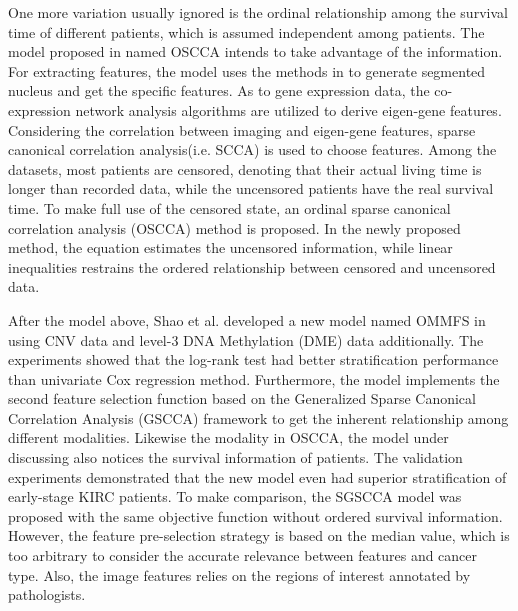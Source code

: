 \documentclass[journal,twoside,web]{ieeecolor}
\begin{document}
One more variation usually ignored is the ordinal relationship among the survival time of different patients, which is assumed independent among patients.
The model proposed in \cite{shao2018ordinal} named OSCCA intends to take advantage of the information.
For extracting features, the model uses the methods in \cite{phoulady2016nucleus} to generate segmented nucleus and get the specific features.
As to gene expression data, the co-expression network analysis algorithms are utilized to derive eigen-gene features.
Considering the correlation between imaging and eigen-gene features, sparse canonical correlation analysis(i.e. SCCA) is used to choose features.
Among the datasets, most patients are censored, denoting that their actual living time is longer than recorded data, while the uncensored patients have the real survival time.
To make full use of the censored state, an ordinal sparse canonical correlation analysis (OSCCA) method is proposed.
In the newly proposed method, the equation estimates the uncensored information, while linear inequalities restrains the ordered relationship between censored and uncensored data. 

After the model above, Shao et al. developed a new model named OMMFS in \cite{shao2019integrative} using CNV data and level-3 DNA Methylation (DME) data additionally.
The experiments showed that the log-rank test\cite{cheng2017integrative} had better stratification performance than univariate Cox regression method.
Furthermore, the model implements the second feature selection function based on the Generalized Sparse Canonical Correlation Analysis (GSCCA) framework\cite{witten2009extensions} to get the inherent relationship among different modalities.
Likewise the modality in OSCCA, the model under discussing also notices the survival information of patients.
The validation experiments demonstrated that the new model even had superior stratification of early-stage KIRC patients.
To make comparison, the SGSCCA model was proposed with the same objective function without ordered survival information.
However, the feature pre-selection strategy is based on the median value, which is too arbitrary to consider the accurate relevance between features and cancer type.
Also, the image features relies on the regions of interest annotated by pathologists.
\end{document}

